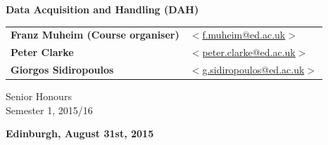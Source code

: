 \vspace{1cm}

\begin{center}
\end{center}

\vspace{1cm}

\begin{center}
{\LARGE\bf Data Acquisition and Handling (DAH)}
\end{center}

\begin{center}

\vspace{2cm}

\begin{tabular}{ll}
{\Large{\bf Franz Muheim (Course organiser)}} & \hspace*{5mm}\href{mailto:f.muheim@ed.ac.uk}{$<$f.muheim@ed.ac.uk$>$} \\
{\Large {\bf Peter Clarke} } & \hspace*{5mm} \href{mailto:peter.clarke@ed.ac.uk}{$<$peter.clarke@ed.ac.uk$>$} \\
{\Large{\bf Giorgos Sidiropoulos} }& \hspace*{5mm} \href{mailto:g.sidiropoulos@ed.ac.uk}{$<$g.sidiropoulos@ed.ac.uk$>$} \\
\end{tabular}

\vspace{2cm}
{\Large Senior Honours} \\
{\Large Semester 1, 2015/16} \\

\vspace{2cm}


{\large\bf Edinburgh, August 31st, 2015}
\end{center}

\vspace{2cm}


